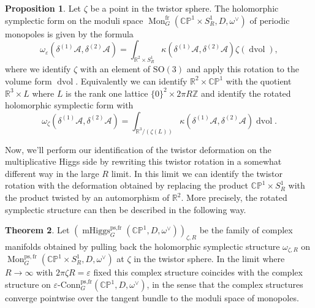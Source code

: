 \documentclass[11pt, oneside, reqno]{amsart}
\theoremstyle{definition} \newtheorem{definition}{Definition}[section]
\newtheorem{theorem}[definition]{Theorem}
\newtheorem{prop}[definition]{Proposition}
\theoremstyle{definition} \newtheorem{remark}[definition]{Remark}
\theoremstyle{definition} \newtheorem{remarks}[definition]{Remarks}
\theoremstyle{definition} \newtheorem{question}[definition]{Question}
\theoremstyle{definition} \newtheorem*{note}{Note}
\theoremstyle{definition} \newtheorem{example}[definition]{Example}
\theoremstyle{definition} \newtheorem{examples}[definition]{Examples}
\newcommand{\bb}[1]{\mathbb{#1}}
\newcommand{\mr}[1]{\mathrm{#1}}
\newcommand{\mc}[1]{\mathcal{#1}}
\newcommand{\RR}{\mathbb{R}}
\newcommand{\ZZ}{\mathbb{Z}}
\newcommand{\eps}{\varepsilon}
\newcommand{\SO}{\mathrm{SO}}
\DeclareMathOperator{\dvol}{dvol}
\DeclareMathOperator{\mhiggs}{mHiggs}
\DeclareMathOperator{\mon}{Mon}
\newcommand{\epsconn}{\varepsilon\text{-Conn}}
\newcommand{\fr}{\mathrm{fr}}
\begin{document}
\begin{prop}
Let $\zeta$ be a point in the twistor sphere.  The holomorphic symplectic form on the moduli space $\mon_G^{\fr}(\bb{CP}^1 \times S^1_R, D, \omega^\vee)$ of periodic monopoles is given by the formula 
\[\omega_\eps(\delta^{(1)}\mc A, \delta^{(2)}\mc A) = \int_{\RR^2 \times S^1_R} \kappa(\delta^{(1)} \mc A, \delta^{(2)} \mc A) \zeta(\dvol),\]
where we identify $\zeta$ with an element of $\SO(3)$ and apply this rotation to the volume form $\dvol$.  Equivalently we can identify $\RR^2 \times \bb{CP}^1$ with the quotient $\RR^3 \times L$ where $L$ is the rank one lattice $\{0\}^2 \times 2\pi R\ZZ$ and identify the rotated holomorphic symplectic form with 
\[\omega_\zeta(\delta^{(1)}\mc A, \delta^{(2)}\mc A) = \int_{\RR^3/(\zeta(L))} \kappa(\delta^{(1)} \mc A, \delta^{(2)} \mc A) \dvol.\]
\end{prop}

Now, we'll perform our identification of the twistor deformation on the multiplicative Higgs side by rewriting this twistor rotation in a somewhat different way in the large $R$ limit.  In this limit we can identify the twistor rotation with the deformation obtained by replacing the product $\bb{CP}^1 \times S^1_R$ with the product twisted by an automorphism of $\RR^2$.  More precisely, the rotated symplectic structure can then be described in the following way.

\begin{theorem} \label{HK_rotation_thm}
Let $\left(\mhiggs^{\text{ps,fr}}_G(\bb{CP}^1,D,\omega^\vee)\right)_{\zeta,R}$ be the family of complex manifolds obtained by pulling back the holomorphic symplectic structure $\omega_{\zeta,R}$ on $\mon_G^{\mr{ps},\fr}(\bb{CP}^1 \times S^1_R,D,\omega^\vee)$ at $\zeta$ in the twistor sphere.  In the limit where $R \to \infty$ with $2 \pi \zeta R = \eps$ fixed this complex structure coincides with the complex structure on $\epsconn^{\text{ps,fr}}_G(\bb{CP}^1,D,\omega^\vee)$, in the sense that the complex structures converge pointwise over the tangent bundle to the moduli space of monopoles. 
\end{theorem}
\end{document}
